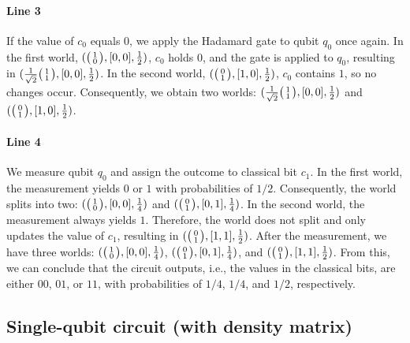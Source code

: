 \paragraph{Line 3}

If the value of $c_0$ equals $0$, we apply the Hadamard gate to qubit $q_0$
once again.
%
In the first world, $(\big(\begin{smallmatrix}1\\0\end{smallmatrix}\big),[0,0],\frac{1}{2})$, $c_0$ holds $0$, and
the gate is applied to $q_0$, resulting in
$(\frac{1}{\sqrt{2}}\big(\begin{smallmatrix}1\\1\end{smallmatrix}\big),[0,0],\frac{1}{2})$.
%
In the second world, $(\big(\begin{smallmatrix}0\\1\end{smallmatrix}\big),[1,0],\frac{1}{2})$, $c_0$ contains $1$, so
no changes occur.
%
Consequently, we obtain two worlds:
$(\frac{1}{\sqrt{2}}\big(\begin{smallmatrix}1\\1\end{smallmatrix}\big),[0,0],\frac{1}{2})$ and
$(\big(\begin{smallmatrix}0\\1\end{smallmatrix}\big),[1,0],\frac{1}{2})$.

\paragraph{Line 4}

We measure qubit $q_0$ and assign the outcome to classical bit $c_1$.
%
In the first world, the measurement yields $0$ or $1$ with probabilities of
$1/2$.
%
Consequently, the world splits into two: $(\big(\begin{smallmatrix}1\\0\end{smallmatrix}\big),[0,0],\frac{1}{4})$ and
$(\big(\begin{smallmatrix}0\\1\end{smallmatrix}\big),[0,1],\frac{1}{4})$.
%
In the second world, the measurement always yields $1$.
%
Therefore, the world does not split and only updates the value of $c_1$,
resulting in $(\big(\begin{smallmatrix}0\\1\end{smallmatrix}\big),[1,1],\frac{1}{2})$.
%
After the measurement, we have three worlds:
$(\big(\begin{smallmatrix}1\\0\end{smallmatrix}\big),[0,0],\frac{1}{4})$, $(\big(\begin{smallmatrix}0\\1\end{smallmatrix}\big),[0,1],\frac{1}{4})$, and
$(\big(\begin{smallmatrix}0\\1\end{smallmatrix}\big),[1,1],\frac{1}{2})$.
%
From this, we can conclude that the circuit outputs, i.e., the values in the
classical bits, are either $00$, $01$, or $11$, with probabilities of $1/4$,
$1/4$, and $1/2$, respectively.

\subsection{Single-qubit circuit (with density matrix)}
\label{ch:openqasmcore:example:matrix}

